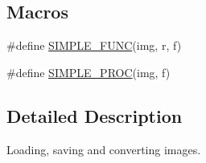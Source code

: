 \subsection*{Macros}
\begin{DoxyCompactItemize}
\item 
\#define \hyperlink{group___i_l_gae03210f6b49f7893564886742e1c601f}{S\+I\+M\+P\+L\+E\+\_\+\+F\+U\+N\+C}(img, r, f)
\item 
\#define \hyperlink{group___i_l_ga260bbe56f23e83e488d095877d70f75c}{S\+I\+M\+P\+L\+E\+\_\+\+P\+R\+O\+C}(img, f)
\end{DoxyCompactItemize}


\subsection{Detailed Description}
Loading, saving and converting images. 



